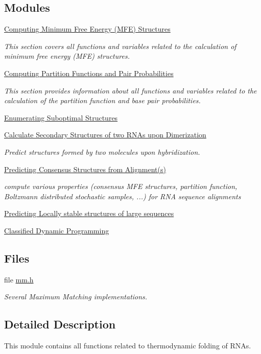 \subsection*{Modules}
\begin{DoxyCompactItemize}
\item 
\hyperlink{group__mfe__fold}{Computing Minimum Free Energy (\+M\+F\+E) Structures}
\begin{DoxyCompactList}\small\item\em This section covers all functions and variables related to the calculation of minimum free energy (M\+F\+E) structures. \end{DoxyCompactList}\item 
\hyperlink{group__pf__fold}{Computing Partition Functions and Pair Probabilities}
\begin{DoxyCompactList}\small\item\em This section provides information about all functions and variables related to the calculation of the partition function and base pair probabilities. \end{DoxyCompactList}\item 
\hyperlink{group__subopt__fold}{Enumerating Suboptimal Structures}
\item 
\hyperlink{group__cofold}{Calculate Secondary Structures of two R\+N\+As upon Dimerization}
\begin{DoxyCompactList}\small\item\em Predict structures formed by two molecules upon hybridization. \end{DoxyCompactList}\item 
\hyperlink{group__consensus__fold}{Predicting Consensus Structures from Alignment(s)}
\begin{DoxyCompactList}\small\item\em compute various properties (consensus M\+F\+E structures, partition function, Boltzmann distributed stochastic samples, ...) for R\+N\+A sequence alignments \end{DoxyCompactList}\item 
\hyperlink{group__local__fold}{Predicting Locally stable structures of large sequences}
\item 
\hyperlink{group__class__fold}{Classified Dynamic Programming}
\end{DoxyCompactItemize}
\subsection*{Files}
\begin{DoxyCompactItemize}
\item 
file \hyperlink{mm_8h}{mm.\+h}
\begin{DoxyCompactList}\small\item\em Several Maximum Matching implementations. \end{DoxyCompactList}\end{DoxyCompactItemize}


\subsection{Detailed Description}
This module contains all functions related to thermodynamic folding of R\+N\+As. 

